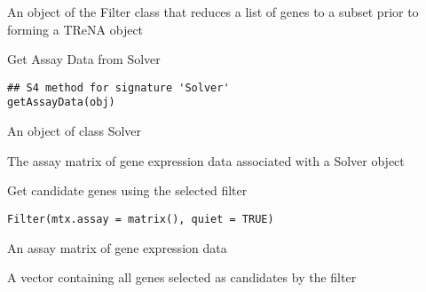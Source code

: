 \documentclass[a4paper]{book}
\begin{document}
%
\begin{Value}
An object of the Filter class that reduces a list of genes to a subset prior to forming a TReNA object
\end{Value}
%
\begin{Description}\relax
Get Assay Data from Solver
\end{Description}
%
\begin{Usage}
\begin{verbatim}
## S4 method for signature 'Solver'
getAssayData(obj)
\end{verbatim}
\end{Usage}
%
\begin{Arguments}
\begin{ldescription}
\item[\code{obj}] An object of class Solver
\end{ldescription}
\end{Arguments}
%
\begin{Value}
The assay matrix of gene expression data associated with a Solver object
\end{Value}
%
\begin{Description}\relax
Get candidate genes using the selected filter
\end{Description}
%
\begin{Usage}
\begin{verbatim}
Filter(mtx.assay = matrix(), quiet = TRUE)
\end{verbatim}
\end{Usage}
%
\begin{Arguments}
\begin{ldescription}
\item[\code{mtx.assay}] An assay matrix of gene expression data
\end{ldescription}
\end{Arguments}
%
\begin{Value}
A vector containing all genes selected as candidates by the filter
\end{Value}
%
\end{document}

